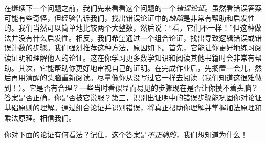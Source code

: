 在继续下一个问题之前，我们先来看看这个问题的一个\emph{错误论证}。虽然看错误答案可能有些奇怪，但经验告诉我们，找出错误论证中的\emph{缺陷}是非常有帮助和启发性的。我们当然可以简单地比较两个大整数，然后说：``看，它们不一样！''但这种做法并没有什么启发性。相反，我们希望通过一个组合论证，找出导致逻辑错误或错误计数的步骤。我们强烈推荐这种方法，原因如下。首先，它能让你更好地练习阅读证明和理解他人的论证。这在你学习更多数学知识和阅读其他书籍时会非常有帮助。其次，它能帮助你更好地审视自己的证明。在完成作业后，先搁置一会儿，然后再用清醒的头脑重新阅读。尽量像你从没写过它一样去阅读（我们知道这很难做到！）。它是否有合理？一些当时看似显而易见的步骤现在是否让你摸不着头脑？答案是否正确，你是否被它说服？第三，识别出证明中的错误步骤能巩固你对论证基础原则的理解。通过组合论证并识别错误，将真正帮助你理解并掌握加法原理和乘法原理。相信我们。

你对下面的论证有何看法？记住，这个答案是\emph{不正确的}，我们想知道为什么！\\


